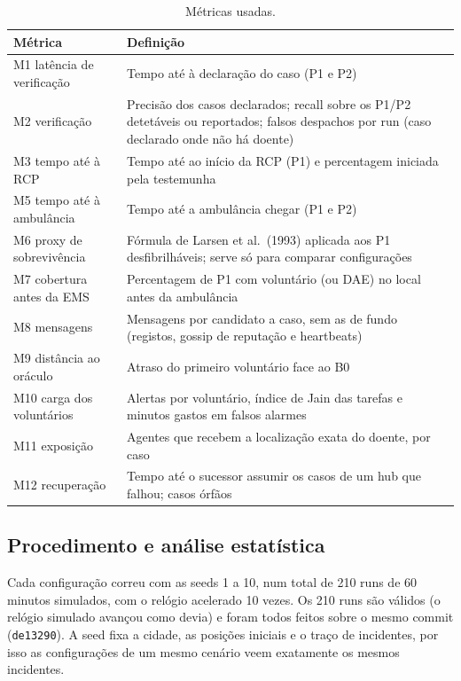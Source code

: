 \documentclass[11pt,a4paper]{article}
\begin{document}
\begin{table}[htbp]
\centering
\small
\caption{Métricas usadas.}\label{tab:metricas}
\begin{tabularx}{\textwidth}{P{4.2cm}L}
\toprule
Métrica & Definição \\
\midrule
M1 latência de verificação & Tempo até à declaração do caso (P1 e P2) \\
M2 verificação & Precisão dos casos declarados; recall sobre os P1/P2 detetáveis ou reportados; falsos despachos por run (caso declarado onde não há doente) \\
M3 tempo até à RCP & Tempo até ao início da RCP (P1) e percentagem iniciada pela testemunha \\
M5 tempo até à ambulância & Tempo até a ambulância chegar (P1 e P2) \\
M6 proxy de sobrevivência & Fórmula de Larsen et al.\ (1993) aplicada aos P1 desfibrilháveis; serve só para comparar configurações \\
M7 cobertura antes da EMS & Percentagem de P1 com voluntário (ou DAE) no local antes da ambulância \\
M8 mensagens & Mensagens por candidato a caso, sem as de fundo (registos, gossip de reputação e heartbeats) \\
M9 distância ao oráculo & Atraso do primeiro voluntário face ao B0 \\
M10 carga dos voluntários & Alertas por voluntário, índice de Jain das tarefas e minutos gastos em falsos alarmes \\
M11 exposição & Agentes que recebem a localização exata do doente, por caso \\
M12 recuperação & Tempo até o sucessor assumir os casos de um hub que falhou; casos órfãos \\
\bottomrule
\end{tabularx}
\end{table}

\subsection{Procedimento e análise estatística}\label{sec:estat}

Cada configuração correu com as seeds 1 a 10, num total de 210 runs de 60 minutos simulados, com o relógio acelerado 10 vezes. Os 210 runs são válidos (o relógio simulado avançou como devia) e foram todos feitos sobre o mesmo commit (\texttt{de13290}). A seed fixa a cidade, as posições iniciais e o traço de incidentes, por isso as configurações de um mesmo cenário veem exatamente os mesmos incidentes.
\end{document}
